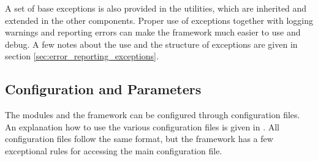 A set of base exceptions is also provided in the utilities, which are inherited and extended in the other components. Proper use of exceptions together with logging warnings and reporting errors can make the framework much easier to use and debug. A few notes about the use and the structure of exceptions are given in section \ref{sec:error_reporting_exceptions}.

\subsection{Configuration and Parameters}
\label{sec:config_parameters}
The modules and the framework can be configured through configuration files. An explanation how to use the various configuration files is given in \needref. All configuration files follow the same format, but the framework has a few exceptional rules for accessing the main configuration file.


